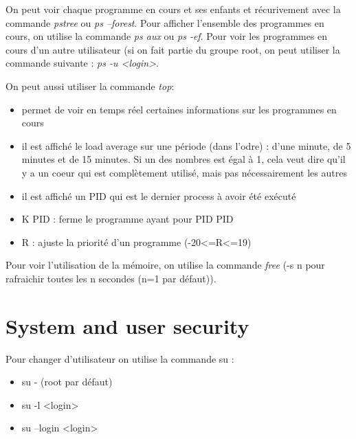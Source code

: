 \documentclass{article}
\begin{document}
On peut voir chaque programme en cours et ses enfants et récurivement avec la commande \textit{pstree} ou \textit{ps --forest}. Pour afficher l'ensemble des programmes en cours, on utilise la commande \textit{ps aux} ou \textit{ps -ef}. Pour voir les programmes en cours d'un autre utilisateur (si on fait partie du groupe root, on peut utiliser la commande suivante : \textit{ps -u <login>}.\newline

On peut aussi utiliser la commande \textit{top}:
\begin{itemize}
    \item permet de voir en temps réel certaines informations sur les programmes en cours
    \item il est affiché le load average sur une période (dans l'odre) : d'une minute, de 5 minutes et de 15 minutes. Si un des nombres est égal à 1, cela veut dire qu'il y a un coeur qui est complètement utilisé, mais pas nécessairement les autres
    \item il est affiché un PID qui est le dernier process à avoir été exécuté
    \item K PID : ferme le programme ayant pour PID PID
    \item R : ajuste la priorité d'un programme (-20<=R<=19)
\end{itemize}

\noindent Pour voir l'utilisation de la mémoire, on utilise la commande \textit{free} (-s n pour rafraichir toutes les n secondes (n=1 par défaut)).\newline

\newpage
\section{System and user security}
Pour changer d'utilisateur on utilise la commande su : 
\begin{itemize}
    \item su -  (root par défaut)
    \item su -l <login>
    \item su --login <login>
\end{itemize}
\end{document}
